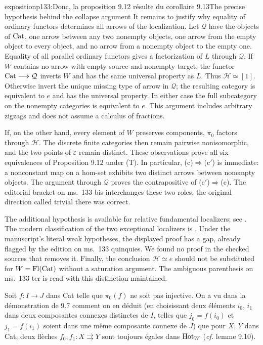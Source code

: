\begin{dcomment}{exposition}{p133:Donc, la proposition 9.12 résulte du corollaire 9.13}{The precise hypothesis behind the collapse argument}
It remains to justify why equality of ordinary functors determines all arrows of the localization. Let $\mathcal Q$ have the objects of $\mathrm{Cat}$, one arrow between any two nonempty objects, one arrow from the empty object to every object, and no arrow from a nonempty object to the empty one. Equality of all parallel ordinary functors gives a factorization of $L$ through $\mathcal Q$. If $W$ contains no arrow with empty source and nonempty target, the functor $\mathrm{Cat}\longrightarrow\mathcal Q$ inverts $W$ and has the same universal property as $L$. Thus $\mathcal H\simeq[1]$. Otherwise invert the unique missing type of arrow in $\mathcal Q$; the resulting category is equivalent to $e$ and has the universal property. In either case the full subcategory on the nonempty categories is equivalent to $e$. This argument includes arbitrary zigzags and does not assume a calculus of fractions.

If, on the other hand, every element of $W$ preserves components, $\pi_0$ factors through $\mathcal H$. The discrete finite categories then remain pairwise nonisomorphic, and the two points of $\varepsilon$ remain distinct. These observations prove all six equivalences of Proposition 9.12 under (T). In particular, (c)$\Rightarrow$(c$'$) is immediate: a nonconstant map on a hom-set exhibits two distinct arrows between nonempty objects. The argument through $\mathcal Q$ proves the contrapositive of (c$'$)$\Rightarrow$(c). The editorial bracket on ms.~133 bis interchanges these two roles; the original direction called trivial there was correct.

The additional hypothesis is available for relative fundamental localizers; see \citet[Propositions 2.1.3 and 2.1.9]{Maltsiniotis2020}. The modern classification of the two exceptional localizers is \citet[Proposition 9.3.2]{Cisinski2006}. Under the manuscript's literal weak hypotheses, the displayed proof has a gap, already flagged by the edition on ms.~133 quinquies. We found no proof in the checked sources that removes it. Finally, the conclusion $\mathcal H\simeq e$ should not be substituted for $W=\mathrm{Fl}(\mathrm{Cat})$ without a saturation argument. The ambiguous parenthesis on ms.~133 ter is read with this distinction maintained.
\end{dcomment}


Soit $f:I\longrightarrow J$ dans Cat telle que $\pi_0(f)$ ne soit pas injective. On a vu dans la démonstration de 9.7 comment on en déduit (en choisissant deux éléments $i_0$, $i_1$ dans deux composantes connexes distinctes de $I$, telles que $j_0=f(i_0)$ et $j_1=f(i_1)$ soient dans une même composante connexe de $J$) que pour $X$, $Y$ dans Cat, deux flèches $f_0,f_1:X\rightrightarrows Y$ sont toujours égales dans $\mathrm{Hot}_W$ (\textit{cf.} lemme 9.10).

